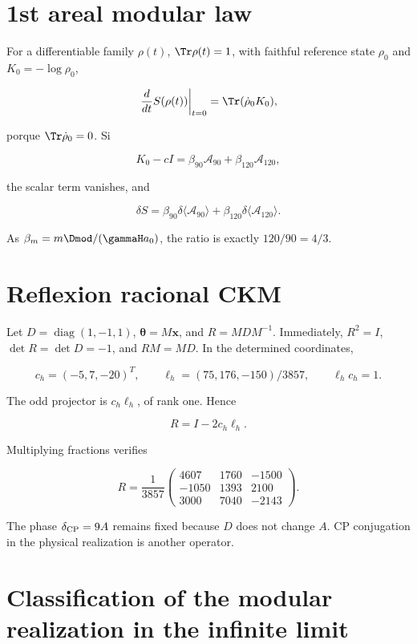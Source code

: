 \section{1st areal modular law}

For a differentiable family \(\rho(t)\), \(\Tr\rho(t)=1\), with faithful reference state \(\rho_0\) and \(K_0=-\log\rho_0\),

\[
\left.\frac{d}{dt}S(\rho(t))\right|_{t=0}
=\Tr(\dot\rho_0K_0),
\]

porque \(\Tr\dot\rho_0=0\). Si

\[
K_0-cI=\beta_{90}\mathcal A_{90}
+\beta_{120}\mathcal A_{120},
\]

the scalar term vanishes, and

\[
\delta S=\beta_{90}\delta\langle\mathcal A_{90}\rangle
+\beta_{120}\delta\langle\mathcal A_{120}\rangle.
\]

As \(\beta_m=m\Dmod/(\gammaH a_0)\), the ratio is exactly \(120/90=4/3\).

\section{Reflexion racional CKM}

Let \(D=\operatorname{diag}(1,-1,1)\), \(\boldsymbol\theta=M\mathbf x\), and
\(R=MDM^{-1}\). Immediately, \(R^2=I\), \(\det R=\det D=-1\), and
\(RM=MD\). In the determined coordinates,

\[
c_h=(-5,7,-20)^T,\qquad
\ell_h=(75,176,-150)/3857,\qquad \ell_hc_h=1.
\]

The odd projector is \(c_h\ell_h\), of rank one. Hence

\[
R=I-2c_h\ell_h.
\]

Multiplying fractions verifies

\[
R=\frac1{3857}
\begin{pmatrix}
4607&1760&-1500\\
-1050&1393&2100\\
3000&7040&-2143
\end{pmatrix}.
\]

The phase \(\delta_{\rm CP}=9A\) remains fixed because \(D\) does not change \(A\). CP conjugation in the physical realization is another operator.

\section{Classification of the modular realization in the infinite limit}

